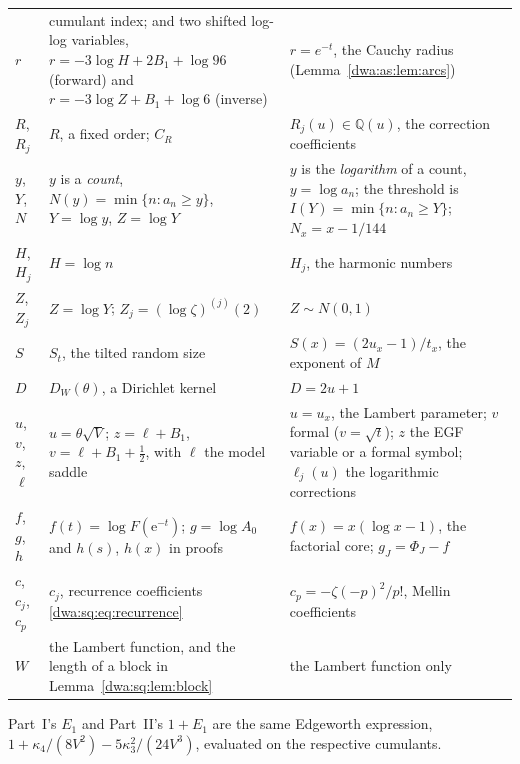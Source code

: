 \documentclass[11pt,letterpaper]{article}
\numberwithin{equation}{section}
\theoremstyle{remark}
\newcommand{\e}{\mathrm e}
\begin{document}
\begin{center}
\begin{tabular}{@{}>{\raggedright\arraybackslash}p{} >{\raggedright\arraybackslash}p{} >{\raggedright\arraybackslash}p{}@{}}
$r$ & cumulant index; and two shifted log-log variables, $r=-3\log H+2B_1+\log96$ (forward) and $r=-3\log Z+B_1+\log6$ (inverse) & $r=e^{-t}$, the Cauchy radius (Lemma~\ref{dwa:as:lem:arcs})\\
$R$, $R_j$ & $R$, a fixed order; $C_R$ & $R_j(u)\in\mathbb Q(u)$, the correction coefficients\\
$y$, $Y$, $N$ & $y$ is a \emph{count}, $N(y)=\min\{n:a_n\ge y\}$, $Y=\log y$, $Z=\log Y$ & $y$ is the \emph{logarithm} of a count, $y=\log a_n$; the threshold is $I(Y)=\min\{n:a_n\ge Y\}$; $N_x=x-1/144$\\
$H$, $H_j$ & $H=\log n$ & $H_j$, the harmonic numbers\\
$Z$, $Z_j$ & $Z=\log Y$; $Z_j=(\log\zeta)^{(j)}(2)$ & $Z\sim N(0,1)$\\
$S$ & $S_t$, the tilted random size & $S(x)=(2u_x-1)/t_x$, the exponent of $M$\\
$D$ & $D_W(\theta)$, a Dirichlet kernel & $D=2u+1$\\
$u$, $v$, $z$, $\ell$ & $u=\theta\sqrt V$; $z=\ell+B_1$, $v=\ell+B_1+\frac12$, with $\ell$ the model saddle & $u=u_x$, the Lambert parameter; $v$ formal ($v=\sqrt t$); $z$ the EGF variable or a formal symbol; $\ell_j(u)$ the logarithmic corrections\\
$f$, $g$, $h$ & $f(t)=\log F(\e^{-t})$; $g=\log A_0$ and $h(s)$, $h(x)$ in proofs & $f(x)=x(\log x-1)$, the factorial core; $g_J=\Phi_J-f$\\
$c$, $c_j$, $c_p$ & $c_j$, recurrence coefficients \eqref{dwa:sq:eq:recurrence} & $c_p=-\zeta(-p)^2/p!$, Mellin coefficients\\
$W$ & the Lambert function, and the length of a block in Lemma~\ref{dwa:sq:lem:block} & the Lambert function only\\
\bottomrule
\end{tabular}
\end{center}
Part~I's $E_1$ and Part~II's $1+E_1$ are the same Edgeworth expression, $1+\kappa_4/(8V^2)-5\kappa_3^2/(24V^3)$, evaluated on the respective cumulants.
\end{document}
